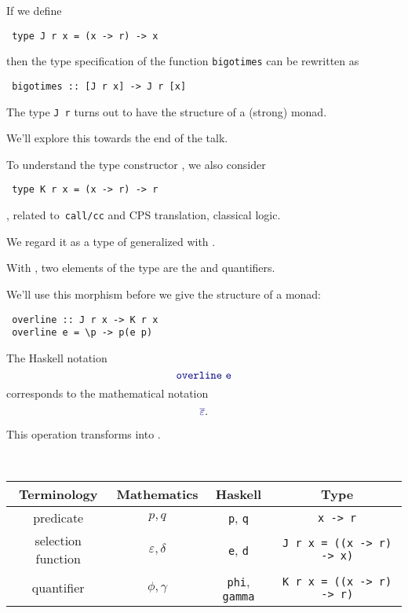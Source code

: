 \documentclass%
[%
Screen4to3,
]{foils}
\begin{document}

If we define
\begin{verbatim}
 type J r x = (x -> r) -> x 
\end{verbatim}
then the type specification of the function \verb+bigotimes+ can be
rewritten as
\begin{verbatim}
 bigotimes :: [J r x] -> J r [x]
\end{verbatim}

\vfill

The type \verb+J r+ turns out to have the structure of a (strong) monad.

We'll explore this towards the end of the talk.


\vfill
To understand the type constructor , we also consider
\begin{verbatim}
 type K r x = (x -> r) -> r
\end{verbatim}

\vfill

, related to~\verb+call/cc+ and CPS
translation, classical logic.

\vfill

We regard it as a type of generalized 
with . 

\vfill

With , two elements of the type
 are the  and
 quantifiers.




We'll use this morphism before we give  the
structure of a monad:
\begin{verbatim}
 overline :: J r x -> K r x
 overline e = \p -> p(e p)
\end{verbatim}

\vfill

The Haskell notation 
\[
\darkblue{\mathtt{overline~e}}
\]
corresponds to the mathematical notation 
\[
\darkblue{\overline
\varepsilon}. 
\]

This operation transforms  into
.


\vfill

~~~~~~
  \begin{tabular}{|c|c|c|c|} \hline Terminology & Mathematics &
    Haskell & Type \\ \hline\hline predicate & $p,q$ & \verb+p+,
    \verb+q+ & \verb+x -> r+ \\ \hline selection function &
    $\varepsilon, \delta$ & \verb+e+, \verb+d+ &
    \verb+J r x = ((x -> r) -> x)+ 
\\ \hline quantifier & $\phi,
    \gamma$ & \verb+phi+, \verb+gamma+ &
    \verb+K r x = ((x -> r) -> r)+ 
\\ \hline
\end{tabular}
\end{document}
